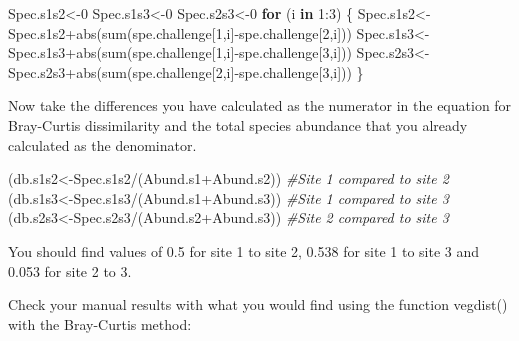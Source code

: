 \documentclass[
]{book}
\newenvironment{Shaded}{\begin{snugshade}}{\end{snugshade}}
\newcommand{\CommentTok}[1]{\textcolor[rgb]{0.56,0.35,0.01}{\textit{#1}}}
\newcommand{\ControlFlowTok}[1]{\textcolor[rgb]{0.13,0.29,0.53}{\textbf{#1}}}
\newcommand{\DecValTok}[1]{\textcolor[rgb]{0.00,0.00,0.81}{#1}}
\newcommand{\FunctionTok}[1]{\textcolor[rgb]{0.00,0.00,0.00}{#1}}
\newcommand{\NormalTok}[1]{#1}
\newcommand{\OtherTok}[1]{\textcolor[rgb]{0.56,0.35,0.01}{#1}}
\newcommand{\SpecialCharTok}[1]{\textcolor[rgb]{0.00,0.00,0.00}{#1}}
\begin{document}
\begin{Shaded}
\begin{Highlighting}[]
\NormalTok{Spec.s1s2}\OtherTok{\textless{}{-}}\DecValTok{0}
\NormalTok{Spec.s1s3}\OtherTok{\textless{}{-}}\DecValTok{0}
\NormalTok{Spec.s2s3}\OtherTok{\textless{}{-}}\DecValTok{0}
\ControlFlowTok{for}\NormalTok{ (i }\ControlFlowTok{in} \DecValTok{1}\SpecialCharTok{:}\DecValTok{3}\NormalTok{) \{}
\NormalTok{  Spec.s1s2}\OtherTok{\textless{}{-}}\NormalTok{Spec.s1s2}\SpecialCharTok{+}\FunctionTok{abs}\NormalTok{(}\FunctionTok{sum}\NormalTok{(spe.challenge[}\DecValTok{1}\NormalTok{,i]}\SpecialCharTok{{-}}\NormalTok{spe.challenge[}\DecValTok{2}\NormalTok{,i]))}
\NormalTok{  Spec.s1s3}\OtherTok{\textless{}{-}}\NormalTok{Spec.s1s3}\SpecialCharTok{+}\FunctionTok{abs}\NormalTok{(}\FunctionTok{sum}\NormalTok{(spe.challenge[}\DecValTok{1}\NormalTok{,i]}\SpecialCharTok{{-}}\NormalTok{spe.challenge[}\DecValTok{3}\NormalTok{,i]))}
\NormalTok{  Spec.s2s3}\OtherTok{\textless{}{-}}\NormalTok{Spec.s2s3}\SpecialCharTok{+}\FunctionTok{abs}\NormalTok{(}\FunctionTok{sum}\NormalTok{(spe.challenge[}\DecValTok{2}\NormalTok{,i]}\SpecialCharTok{{-}}\NormalTok{spe.challenge[}\DecValTok{3}\NormalTok{,i])) \}}
\end{Highlighting}
\end{Shaded}

Now take the differences you have calculated as the numerator in the
equation for Bray-Curtis dissimilarity and the total species abundance
that you already calculated as the denominator.

\begin{Shaded}
\begin{Highlighting}[]
\NormalTok{(db.s1s2}\OtherTok{\textless{}{-}}\NormalTok{Spec.s1s2}\SpecialCharTok{/}\NormalTok{(Abund.s1}\SpecialCharTok{+}\NormalTok{Abund.s2)) }\CommentTok{\#Site 1 compared to site 2}
\NormalTok{(db.s1s3}\OtherTok{\textless{}{-}}\NormalTok{Spec.s1s3}\SpecialCharTok{/}\NormalTok{(Abund.s1}\SpecialCharTok{+}\NormalTok{Abund.s3)) }\CommentTok{\#Site 1 compared to site 3}
\NormalTok{(db.s2s3}\OtherTok{\textless{}{-}}\NormalTok{Spec.s2s3}\SpecialCharTok{/}\NormalTok{(Abund.s2}\SpecialCharTok{+}\NormalTok{Abund.s3)) }\CommentTok{\#Site 2 compared to site 3 }
\end{Highlighting}
\end{Shaded}

You should find values of 0.5 for site 1 to site 2, 0.538 for site 1 to
site 3 and 0.053 for site 2 to 3.

Check your manual results with what you would find using the function
vegdist() with the Bray-Curtis method:
\end{document}
